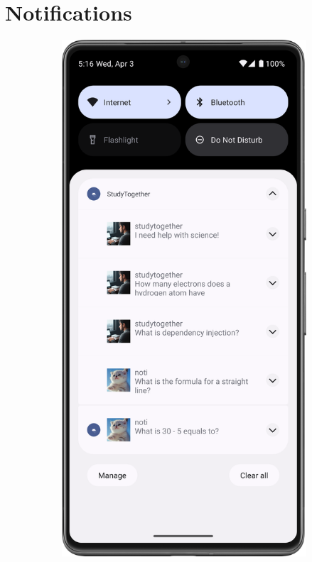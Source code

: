 \section{Notifications}

\begin{figure}[H]
  \begin{subfigure}[b]{0.5\textwidth}
    \includegraphics[width=\textwidth]{Figures/Product_Images/Notification/notification.png}

\end{subfigure}
\end{figure}
